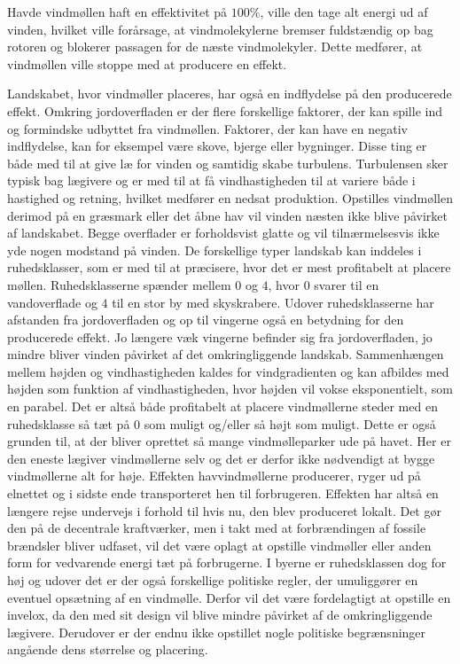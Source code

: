 Havde vindmøllen haft en effektivitet på $100 \%$, ville den tage alt energi ud af vinden, hvilket ville forårsage, at vindmolekylerne bremser fuldstændig op bag rotoren og blokerer passagen for de næste vindmolekyler. Dette medfører, at vindmøllen ville stoppe med at producere en effekt. 

Landskabet, hvor vindmøller placeres, har også en indflydelse på den producerede effekt. Omkring jordoverfladen er der flere forskellige faktorer, der kan spille ind og formindske udbyttet fra vindmøllen. Faktorer, der kan have en negativ indflydelse, kan for eksempel være skove, bjerge eller bygninger. Disse ting er både med til at give læ for vinden og samtidig skabe turbulens. Turbulensen sker typisk bag lægivere og er med til at få vindhastigheden til at variere både i hastighed og retning, hvilket medfører en nedsat produktion. 
Opstilles vindmøllen derimod på en græsmark eller det åbne hav vil vinden næsten ikke blive påvirket af landskabet. Begge overflader er forholdsvist glatte og vil tilnærmelsesvis ikke yde nogen modstand på vinden. 
De forskellige typer landskab kan inddeles i ruhedsklasser, som er med til at præcisere, hvor det er mest profitabelt at placere møllen. Ruhedsklasserne spænder mellem $0$ og $4$, hvor $0$ svarer til en vandoverflade og $4$ til en stor by med skyskrabere. 
Udover ruhedsklasserne har afstanden fra jordoverfladen og op til vingerne også en betydning for den producerede effekt. Jo længere væk vingerne befinder sig fra jordoverfladen, jo mindre bliver vinden påvirket af det omkringliggende landskab. Sammenhængen mellem højden og vindhastigheden kaldes for vindgradienten og kan afbildes med højden som funktion af vindhastigheden, hvor højden vil vokse eksponentielt, som en parabel. 
Det er altså både profitabelt at placere vindmøllerne steder med en ruhedsklasse så tæt på $0$ som muligt og/eller så højt som muligt. Dette er også grunden til, at der bliver oprettet så mange vindmølleparker ude på havet. Her er den eneste lægiver vindmøllerne selv og det er derfor ikke nødvendigt at bygge vindmøllerne alt for høje. 
Effekten havvindmøllerne producerer, ryger ud på elnettet og i sidste ende transporteret hen til forbrugeren. Effekten har altså en længere rejse undervejs i forhold til hvis nu, den blev produceret lokalt. Det gør den på de decentrale kraftværker, men i takt med at forbrændingen af fossile brændsler bliver udfaset, vil det være oplagt at opstille vindmøller eller anden form for vedvarende energi tæt på forbrugerne. I byerne er ruhedsklassen dog for høj og udover det er der også forskellige politiske regler, der umuliggører en eventuel opsætning af en vindmølle. 
Derfor vil det være fordelagtigt at opstille en invelox, da den med sit design vil blive mindre påvirket af de omkringliggende lægivere. Derudover er der endnu ikke opstillet nogle politiske begrænsninger angående dens størrelse og placering. 